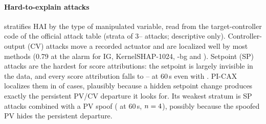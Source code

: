 \paragraph{Hard-to-explain attacks}  stratifies HAI by the type of manipulated variable, read from the target-controller code of the official attack table (strata of 3--\stratcombn{} attacks; descriptive only). Controller-output (CV) attacks move a recorded actuator and are localized well by most methods (0.79 at the alarm for IG, KernelSHAP-1024, \LX-bg and \LX). Setpoint (SP) attacks are the hardest for score attributions: the setpoint is largely invisible in the data, and every score attribution falls to \stratSPteamin--\stratSPteamax{} at 60\,s even with \TEA. PI-CAX localizes them in \stratSPPICAXtea{} of cases, plausibly because a hidden setpoint change produces exactly the persistent PV/CV departure it looks for. Its weakest stratum is SP attacks combined with a PV spoof (\stratSPPVPICAXtea{} at 60\,s, $n=4$), possibly because the spoofed PV hides the persistent departure.



